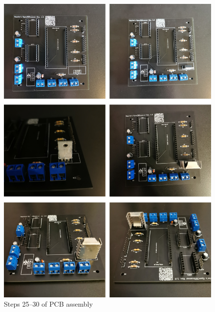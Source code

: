 \begin{figure}[ht!]%
	\begin{centered}%
		\includegraphics[width=\linewidth]{images/PcbSeries5.jpg}%
		\caption{Steps \numrange[text-rm=\lightBoldFont]{25}{30} of PCB assembly}%
	\end{centered}%
\end{figure}%

